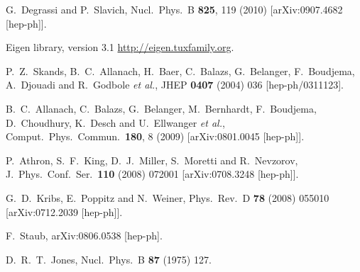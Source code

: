 \documentclass[final,3p,11pt,pdflatex]{elsarticle}
\begin{document}
\begin{thebibliography}{100}
  G.~Degrassi and P.~Slavich,
  Nucl.\ Phys.\ B {\bf 825}, 119 (2010)
  [arXiv:0907.4682 [hep-ph]].

  Eigen library, version 3.1 \url{http://eigen.tuxfamily.org}.

  P.~Z.~Skands, B.~C.~Allanach, H.~Baer, C.~Balazs, G.~Belanger, F.~Boudjema, A.~Djouadi and R.~Godbole {\it et al.},
  JHEP {\bf 0407} (2004) 036
  [hep-ph/0311123].

  B.~C.~Allanach, C.~Balazs, G.~Belanger, M.~Bernhardt, F.~Boudjema, D.~Choudhury, K.~Desch and U.~Ellwanger {\it et al.},
  Comput.\ Phys.\ Commun.\  {\bf 180}, 8 (2009)
  [arXiv:0801.0045 [hep-ph]].



  P.~Athron, S.~F.~King, D.~J.~Miller, S.~Moretti and R.~Nevzorov,
  J.\ Phys.\ Conf.\ Ser.\  {\bf 110} (2008) 072001
  [arXiv:0708.3248 [hep-ph]].



  G.~D.~Kribs, E.~Poppitz and N.~Weiner,
  Phys.\ Rev.\ D {\bf 78} (2008) 055010
  [arXiv:0712.2039 [hep-ph]].

  F.~Staub,
  arXiv:0806.0538 [hep-ph].

  D.~R.~T.~Jones,
  Nucl.\ Phys.\ B {\bf 87} (1975) 127.


\end{thebibliography}
\end{document}
